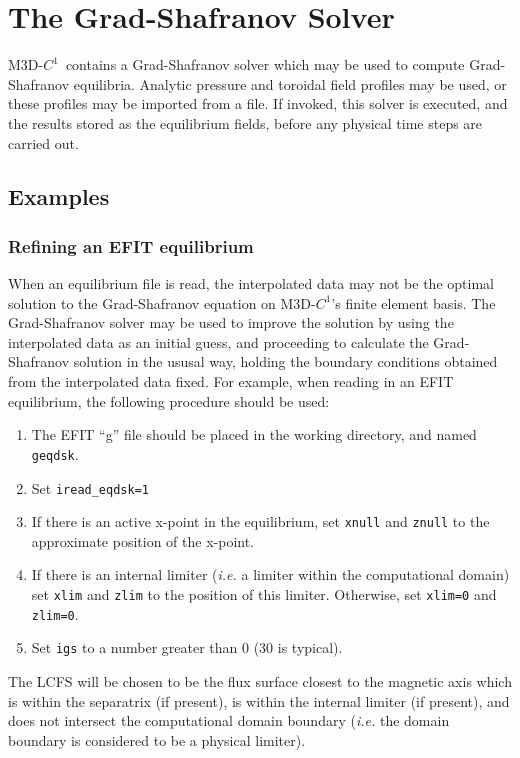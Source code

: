 \documentclass[letterpaper]{book}
\newcommand{\codename}{\textsc{M3D-$C^1$}}
\begin{document}
\section{The Grad-Shafranov Solver}

\codename\ contains a Grad-Shafranov solver which may be used to
compute Grad-Shafranov equilibria.  Analytic pressure and toroidal
field profiles may be used, or these profiles may be imported from a
file.  If invoked, this solver is executed, and the results stored as
the equilibrium fields, before any physical time steps are carried
out.

\subsection{Examples}

\subsubsection{Refining an EFIT equilibrium}
\label{sec:gs_efit}

When an equilibrium file is read, the interpolated data may not be the
optimal solution to the Grad-Shafranov equation on \codename's finite
element basis.  The Grad-Shafranov solver may be used to improve the
solution by using the interpolated data as an initial guess, and
proceeding to calculate the Grad-Shafranov solution in the ususal way,
holding the boundary conditions obtained from the interpolated data
fixed.  For example, when reading in an EFIT equilibrium, the following
procedure should be used:

\begin{enumerate}
\item The EFIT ``g'' file should be placed in the working directory,
  and named \texttt{geqdsk}.
\item Set \texttt{iread\_eqdsk=1}
\item If there is an active x-point in the equilibrium, set
  \texttt{xnull} and \texttt{znull} to the approximate position of the
  x-point.
\item If there is an internal limiter (\emph{i.e.} a limiter within
  the computational domain) set \texttt{xlim} and \texttt{zlim} to the
  position of this limiter.  Otherwise, set \texttt{xlim=0} and
  \texttt{zlim=0}.
\item Set \texttt{igs} to a number greater than 0 (30 is typical).
\end{enumerate}

The LCFS will be chosen to be the flux surface closest to the magnetic
axis which is within the separatrix (if present), is within the
internal limiter (if present), and does not intersect the
computational domain boundary (\textit{i.e.} the domain boundary is
considered to be a physical limiter).
\end{document}
